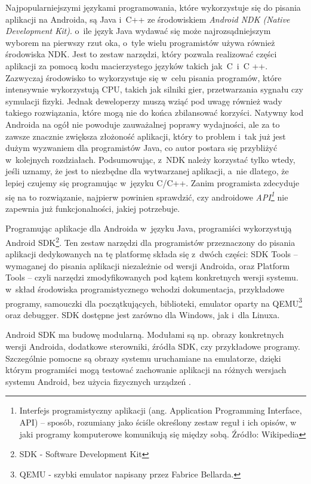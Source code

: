 Najpopularniejszymi językami programowania, które wykorzystuje się do pisania aplikacji na Androida, są Java i~C++ ze środowiskiem \textit{Android NDK (Native Development Kit)}. o~ile język Java wydawać się może najrozsądniejszym wyborem na pierwszy rzut oka, o~tyle wielu programistów używa również środowiska NDK. Jest to zestaw narzędzi, który pozwala realizować części aplikacji za pomocą kodu macierzystego języków takich jak~C~i~C ++. Zazwyczaj środowisko to wykorzystuje się w~celu pisania programów, które intensywnie wykorzystują CPU, takich jak silniki gier, przetwarzania sygnału czy symulacji fizyki. Jednak deweloperzy muszą wziąć pod uwagę również wady takiego rozwiązania, które mogą nie do końca zbilansować korzyści. Natywny kod Androida na ogół nie powoduje zauważalnej poprawy wydajności, ale za to zawsze znacznie zwiększa złożoność aplikacji, który to problem i~tak już jest dużym wyzwaniem dla programistów Java, co autor postara się przybliżyć w~kolejnych rozdziałach. Podsumowując, z~NDK należy korzystać tylko wtedy, jeśli uznamy, że jest to niezbędne dla wytwarzanej aplikacji, a~nie dlatego, że lepiej czujemy się programując w~języku C/C++. Zanim programista zdecyduje się na to rozwiązanie, najpierw powinien sprawdzić, czy androidowe \textit{API\footnote{Interfejs programistyczny aplikacji (ang. Application Programming Interface, API) – sposób, rozumiany jako ściśle określony zestaw reguł i ich opisów, w jaki programy komputerowe komunikują się między sobą. Źródło: Wikipedia}} nie zapewnia już funkcjonalności, jakiej potrzebuje.

Programując aplikacje dla Androida w~języku Java, programiści wykorzystują Android SDK\footnote{SDK - Software Development Kit}. Ten zestaw narzędzi dla programistów przeznaczony do pisania aplikacji dedykowanych na tę platformę składa się z~dwóch części: SDK Tools – wymaganej do pisania aplikacji niezależnie od wersji Androida, oraz Platform Tools – czyli narzędzi zmodyfikowanych pod kątem konkretnych wersji systemu. w~skład środowiska programistycznego wchodzi dokumentacja, przykładowe programy, samouczki dla początkujących, biblioteki, emulator oparty na QEMU\footnote{QEMU - szybki emulator napisany przez Fabrice Bellarda.} oraz debugger. SDK dostępne jest zarówno dla Windows, jak i~dla Linuxa.

Android SDK ma budowę modularną. Modułami są np. obrazy konkretnych wersji Androida, dodatkowe sterowniki, źródła SDK, czy przykładowe programy. Szczególnie pomocne są obrazy systemu uruchamiane na emulatorze, dzięki którym programiści mogą  testować zachowanie aplikacji na różnych wersjach systemu Android, bez użycia fizycznych urządzeń \cite{website:android:sdk}.


